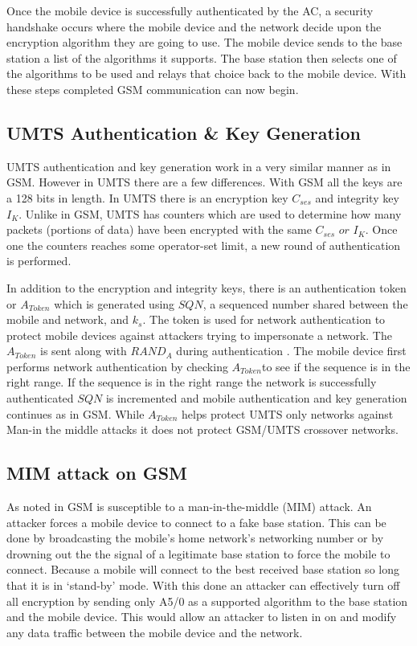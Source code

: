 \documentclass{sig-alternate}
\begin{document}
	 Once the mobile device is successfully authenticated by the AC, a security handshake occurs where the mobile device and the network decide upon the encryption algorithm they are going to use. The mobile device sends to the base station a list of the algorithms it supports. The base station then selects one of the algorithms to be used and relays that choice back to the mobile device. With these steps completed GSM communication can now begin.
		
	\subsection{UMTS Authentication \& Key Generation \label{UMTS:Auth}} 
		UMTS authentication and key generation work in a very similar manner as in GSM. However in UMTS there are a few differences. With GSM all the keys are a 128 bits in length. In UMTS there is an encryption key $C_{ses}$ and integrity key $I_{K}$. Unlike in GSM, UMTS has counters which are used to determine how many packets (portions of data) have been encrypted with the same $\mathit{C_{ses} \text{ or } I_{K}}$. Once one the counters reaches some operator-set limit, a new round of authentication is performed.
		
		 In addition to the encryption and integrity keys, there is an authentication token or $\mathit{A_{Token}}$ which is generated using $\mathit{SQN}$, a sequenced number shared between the mobile and network, and $k_{s}$. The token is used for network authentication to protect mobile devices against attackers trying to impersonate a network. The $A_{Token}$ is sent along with $\mathit{RAND_{A}}$ during authentication \cite{Meyer:2004}. The mobile device first performs network authentication by checking $\mathit{A_{Token}}$to see if the sequence is in the right range. If the sequence is in the right range the network is successfully authenticated $\mathit{SQN}$ is incremented and mobile authentication and key generation continues as in GSM. While $\mathit{A_{Token}}$ helps protect UMTS only networks against Man-in the middle attacks it does not protect GSM/UMTS crossover networks. 
  
	\subsection{MIM attack on GSM}
	As noted in \cite{Meyer:2004} GSM is susceptible to a man-in-the-middle (MIM) attack. An attacker forces a mobile device to connect to a fake base station. This can  be done by broadcasting the mobile's home network's networking number or by drowning out the the signal of a legitimate base station to force the mobile to connect. Because a mobile will connect to the best received base station so long that it is in  `stand-by' mode. With this done an attacker can effectively turn off all encryption by sending only A5/0 as a supported algorithm to the base station and the mobile device. This would allow an attacker to listen in on and modify any data traffic between the mobile device and the network.
\end{document}
